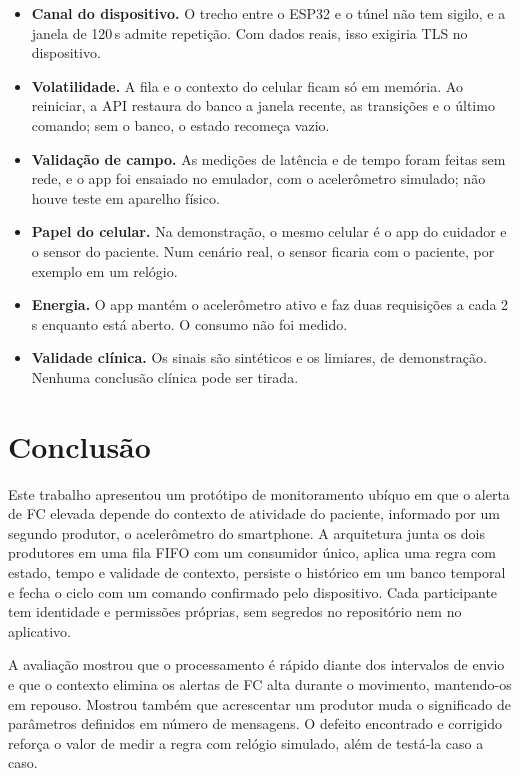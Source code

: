 \documentclass[12pt,a4paper]{article}
\begin{document}
\begin{itemize}
  \item \textbf{Canal do dispositivo.} O trecho entre o ESP32 e o túnel não tem sigilo, e a janela de 120\,s admite repetição. Com dados reais, isso exigiria TLS no dispositivo.
  \item \textbf{Volatilidade.} A fila e o contexto do celular ficam só em memória. Ao reiniciar, a API restaura do banco a janela recente, as transições e o último comando; sem o banco, o estado recomeça vazio.
  \item \textbf{Validação de campo.} As medições de latência e de tempo foram feitas sem rede, e o app foi ensaiado no emulador, com o acelerômetro simulado; não houve teste em aparelho físico.
  \item \textbf{Papel do celular.} Na demonstração, o mesmo celular é o app do cuidador e o sensor do paciente. Num cenário real, o sensor ficaria com o paciente, por exemplo em um relógio.
  \item \textbf{Energia.} O app mantém o acelerômetro ativo e faz duas requisições a cada 2\,s enquanto está aberto. O consumo não foi medido.
  \item \textbf{Validade clínica.} Os sinais são sintéticos e os limiares, de demonstração. Nenhuma conclusão clínica pode ser tirada.
\end{itemize}

\section{Conclusão}\label{sec:concl}

Este trabalho apresentou um protótipo de monitoramento ubíquo em que o alerta de FC elevada depende do contexto de atividade do paciente, informado por um segundo produtor, o acelerômetro do smartphone.
A arquitetura junta os dois produtores em uma fila FIFO com um consumidor único, aplica uma regra com estado, tempo e validade de contexto, persiste o histórico em um banco temporal e fecha o ciclo com um comando confirmado pelo dispositivo.
Cada participante tem identidade e permissões próprias, sem segredos no repositório nem no aplicativo.

A avaliação mostrou que o processamento é rápido diante dos intervalos de envio e que o contexto elimina os alertas de FC alta durante o movimento, mantendo-os em repouso.
Mostrou também que acrescentar um produtor muda o significado de parâmetros definidos em número de mensagens.
O defeito encontrado e corrigido reforça o valor de medir a regra com relógio simulado, além de testá-la caso a caso.
\end{document}
